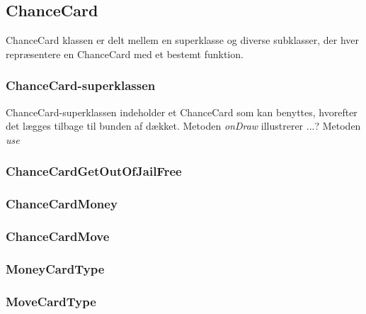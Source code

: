 \documentclass[../../main.tex]{subfiles}
\begin{document}
\begin{flushleft}
\subsection{ChanceCard}

ChanceCard klassen er delt mellem en superklasse og diverse subklasser, der hver repræsentere en ChanceCard med et bestemt funktion.

\subsubsection{ChanceCard-superklassen}
ChanceCard-superklassen indeholder et ChanceCard som kan benyttes, hvorefter det lægges tilbage til bunden af dækket. \newline
Metoden \textit{onDraw} illustrerer ...?
Metoden \textit{use} 



\subsubsection{ChanceCardGetOutOfJailFree}
\subsubsection{ChanceCardMoney}
\subsubsection{ChanceCardMove}
\subsubsection{MoneyCardType}
\subsubsection{MoveCardType}

\end{flushleft}
\end{document}

